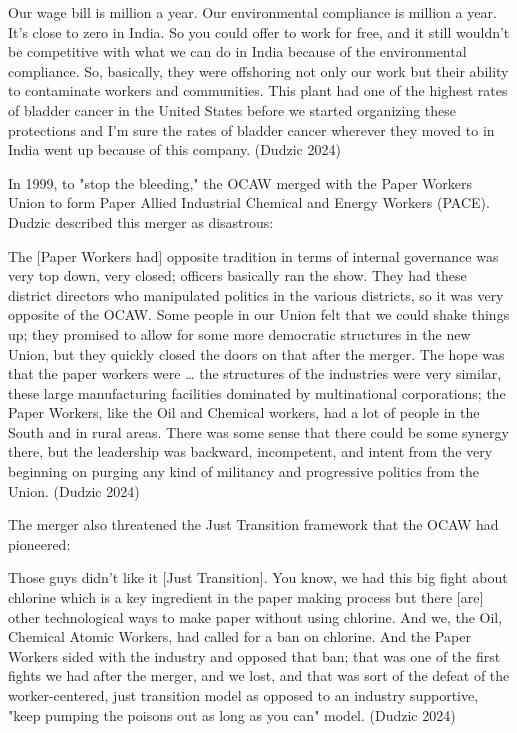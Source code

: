 \documentclass[12pt]{article}
\renewenvironment{quote}
  {\list{}{\leftmargin=\parindent\rightmargin=0pt}%
   \item\relax}
  {\endlist}
\begin{document}
\begin{quote}
Our wage bill is  million a year. Our environmental compliance is  million a year. It's close to zero in India. So you could offer to work for free, and it still wouldn't be competitive with what we can do in India because of the environmental compliance. So, basically, they were offshoring not only our work but their ability to contaminate workers and communities. This plant had one of the highest rates of bladder cancer in the United States before we started organizing these protections and I'm sure the rates of bladder cancer wherever they moved to in India went up because of this company. (Dudzic 2024)
\end{quote}

In 1999, to "stop the bleeding," the OCAW merged with the Paper Workers Union to form Paper Allied Industrial Chemical and Energy Workers (PACE). Dudzic described this merger as disastrous:

\begin{quote}
The [Paper Workers had] opposite tradition in terms of internal governance was very top down, very closed; officers basically ran the show. They had these district directors who manipulated politics in the various districts, so it was very opposite of the OCAW. Some people in our Union felt that we could shake things up; they promised to allow for some more democratic structures in the new Union, but they quickly closed the doors on that after the merger. The hope was that the paper workers were … the structures of the industries were very similar, these large manufacturing facilities dominated by multinational corporations; the Paper Workers, like the Oil and Chemical workers, had a lot of people in the South and in rural areas. There was some sense that there could be some synergy there, but the leadership was backward, incompetent, and intent from the very beginning on purging any kind of militancy and progressive politics from the Union. (Dudzic 2024)
\end{quote}

The merger also threatened the Just Transition framework that the OCAW had pioneered:

\begin{quote}
Those guys didn't like it [Just Transition]. You know, we had this big fight about chlorine which is a key ingredient in the paper making process but there [are] other technological ways to make paper without using chlorine. And we, the Oil, Chemical Atomic Workers, had called for a ban on chlorine. And the Paper Workers sided with the industry and opposed that ban; that was one of the first fights we had after the merger, and we lost, and that was sort of the defeat of the worker-centered, just transition model as opposed to an industry supportive, "keep pumping the poisons out as long as you can" model. (Dudzic 2024)
\end{quote}
\end{document}
